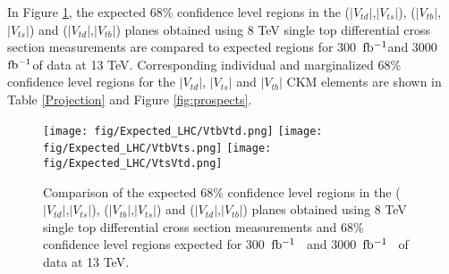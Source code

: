 \documentclass[11pt]{article}
\newcommand{\VTD}{|V_{td}|}
\newcommand{\VTS}{|V_{ts}|}
\newcommand{\VTB}{|V_{tb}|}
\newcommand{\fb}{$\rm fb^{-1}$}
\begin{document}
In Figure \ref{proj2D}, the expected  68\% confidence level regions in the ($\VTD$,$\VTS$), ($\VTB$,$\VTS$) and ($\VTD$,$\VTB$) planes obtained using 8 TeV single top differential cross section measurements are compared to expected regions for  300~\fb and 3000~\fb of data at 13 TeV. Corresponding individual and marginalized   68\% confidence level regions for the $\VTD$, $\VTS$ and $\VTB$ CKM elements are shown in Table \ref{Projection} and Figure \ref{fig:prospects}.




 \begin{figure}[ht]
  \begin{center}
            \texttt{[image: fig/Expected\_LHC/VtbVtd.png]}
            \texttt{[image: fig/Expected\_LHC/VtbVts.png]}
            \texttt{[image: fig/Expected\_LHC/VtsVtd.png]}
    \caption{Comparison of the expected  68\% confidence level regions in the ($\VTD$,$\VTS$), ($\VTB$,$\VTS$) and ($\VTD$,$\VTB$) planes obtained using 8 TeV single top differential cross section measurements and  68\% confidence level regions expected for 300~\fb~ and 3000~\fb~ of data at 13 TeV.
    \label{proj2D}}
  \end{center}
\end{figure}
\end{document}
